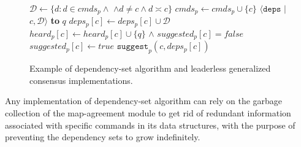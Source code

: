 \begin{figure*}
{{\begin{varwidth}{\dimexpr{}\fboxrule\relax}
		\begin{algorithmic}[1]
			\makeatletter
			\setcounter{ALG@line}{8}
			\makeatother
			{\scriptsize
			 \label{alg:receive-new-cmd}
			\State $\mathcal{D} \gets \{ d : d \in cmds_p \land$\label{alg:update-d}
			\Statex \hspace{2cm}$\land d\neq c \land d \asymp c \}$
			\State $cmds_p\gets cmds_p\cup\{c\}$\label{alg:update-cmds-p}
			 $\langle \texttt{deps}$ $|$ $c,\mathcal{D} \rangle$ {\bf to} $q$\label{alg:send-deps}
			\END
			\Statex
			 \label{alg:receive-deps}
			\State $deps_p[c]\gets deps_p[c]\cup \mathcal{D}$\label{alg:update-deps-p}
			\State $heard_p[c]\gets heard_p[c]\cup \{q\}$
			\END
			\Statex
			 \label{alg:receive-deps}
			\Statex \hspace{1cm}$\land$ $suggested_p[c]=false$
			\State $suggested_p[c]\gets true$
			 $\texttt{suggest}_p(c,deps_p[c])$ \label{alg:call-suggest}
			\END
			}
		\end{algorithmic}
	\end{varwidth}%
}
\label{fig:deps-set-algo2}
}
\caption{Example of dependency-set algorithm and leaderless generalized consensus implementations.}
\label{fig:deps-set-algo}
\end{figure*}



Any implementation of dependency-set algorithm can rely on the garbage collection of the map-agreement module to get rid of redundant information associated with specific commands in its data structures, with the purpose of preventing the dependency sets to grow indefinitely. 
 
